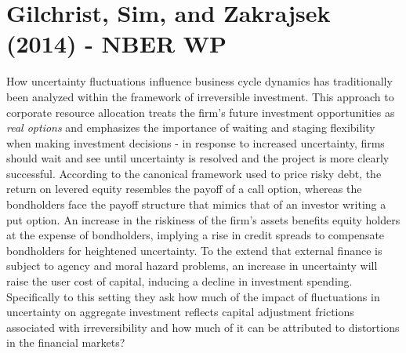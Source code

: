 \documentclass{article}
\begin{document}
{\section*{Gilchrist, Sim, and Zakrajsek (2014) - NBER WP}

How uncertainty fluctuations influence business cycle dynamics has traditionally been analyzed within the framework of irreversible investment. This approach to corporate resource allocation treats the firm's future investment opportunities as \textit{real options} and emphasizes the importance of waiting and staging flexibility when making investment decisions - in response to increased uncertainty, firms should wait and see until uncertainty is resolved and the project is more clearly successful. According to the canonical framework used to price risky debt, the return on levered equity resembles the payoff of a call option, whereas the bondholders face the payoff structure that mimics that of an investor writing a put option. An increase in the riskiness of the firm's assets benefits equity holders at the expense of bondholders, implying a rise in credit spreads to compensate bondholders for heightened uncertainty. To the extend that external finance is subject to agency and moral hazard problems, an increase in uncertainty will raise the user cost of capital, inducing a decline in investment spending. Specifically to this setting they ask how much of the impact of fluctuations in uncertainty on aggregate investment reflects capital adjustment frictions associated with irreversibility and how much of it can be attributed to distortions in the financial markets?

}
\end{document}
